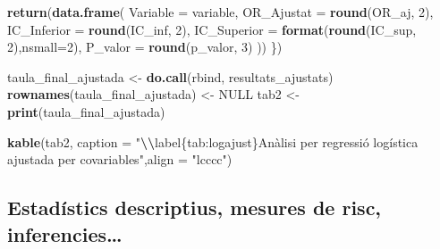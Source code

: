 \documentclass[
]{article}
\newenvironment{Shaded}{\begin{snugshade}}{\end{snugshade}}
\newcommand{\AttributeTok}[1]{\textcolor[rgb]{0.13,0.29,0.53}{#1}}
\newcommand{\ConstantTok}[1]{\textcolor[rgb]{0.56,0.35,0.01}{#1}}
\newcommand{\DecValTok}[1]{\textcolor[rgb]{0.00,0.00,0.81}{#1}}
\newcommand{\FunctionTok}[1]{\textcolor[rgb]{0.13,0.29,0.53}{\textbf{#1}}}
\newcommand{\NormalTok}[1]{#1}
\newcommand{\OtherTok}[1]{\textcolor[rgb]{0.56,0.35,0.01}{#1}}
\newcommand{\SpecialCharTok}[1]{\textcolor[rgb]{0.81,0.36,0.00}{\textbf{#1}}}
\newcommand{\StringTok}[1]{\textcolor[rgb]{0.31,0.60,0.02}{#1}}
\begin{document}
\begin{Shaded}
\begin{Highlighting}[]
    \FunctionTok{return}\NormalTok{(}\FunctionTok{data.frame}\NormalTok{(}
      \AttributeTok{Variable =}\NormalTok{ variable,}
      \AttributeTok{OR\_Ajustat =} \FunctionTok{round}\NormalTok{(OR\_aj, }\DecValTok{2}\NormalTok{),}
      \AttributeTok{IC\_Inferior =} \FunctionTok{round}\NormalTok{(IC\_inf, }\DecValTok{2}\NormalTok{),}
      \AttributeTok{IC\_Superior =} \FunctionTok{format}\NormalTok{(}\FunctionTok{round}\NormalTok{(IC\_sup, }\DecValTok{2}\NormalTok{),}\AttributeTok{nsmall=}\DecValTok{2}\NormalTok{),}
      \AttributeTok{P\_valor =} \FunctionTok{round}\NormalTok{(p\_valor, }\DecValTok{3}\NormalTok{)}
\NormalTok{    ))}
\NormalTok{\})}


\NormalTok{taula\_final\_ajustada }\OtherTok{\textless{}{-}} \FunctionTok{do.call}\NormalTok{(rbind, resultats\_ajustats)}
\FunctionTok{rownames}\NormalTok{(taula\_final\_ajustada) }\OtherTok{\textless{}{-}} \ConstantTok{NULL}
\NormalTok{tab2 }\OtherTok{\textless{}{-}} \FunctionTok{print}\NormalTok{(taula\_final\_ajustada)}
\end{Highlighting}
\end{Shaded}

\begin{Shaded}
\begin{Highlighting}[]
\FunctionTok{kable}\NormalTok{(tab2, }\AttributeTok{caption =} \StringTok{"}\SpecialCharTok{\textbackslash{}\textbackslash{}}\StringTok{label\{tab:logajust\}Anàlisi per regressió logística ajustada per covariables"}\NormalTok{,}\AttributeTok{align =} \StringTok{"lcccc"}\NormalTok{)}
\end{Highlighting}
\end{Shaded}

\subsection{Estadístics descriptius, mesures de risc,
inferencies\ldots{}}\label{estaduxedstics-descriptius-mesures-de-risc-inferencies-1}
\end{document}
